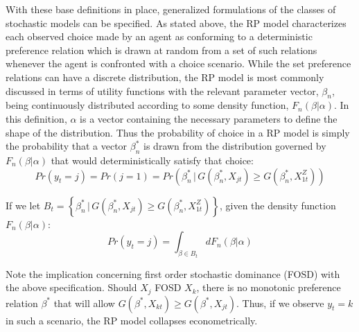 \documentclass[11pt,a4paper]{article}
\newcommand\Prob{\ensuremath{\mathit{Pr}}}  %
\begin{document}
With these base definitions in place, generalized formulations of the classes of stochastic models can be specified.
As stated above, the RP model characterizes each observed choice made by an agent as conforming to a deterministic preference relation which is drawn at random from a set of such relations whenever the agent is confronted with a choice scenario.
While the set preference relations can have a discrete distribution, the RP model is most commonly discussed in terms of utility functions with the relevant parameter vector, $\beta_n$, being continuously distributed according to some density function, $F_n(\beta | \alpha)$.
In this definition, $\alpha$ is a vector containing the necessary parameters to define the shape of the distribution.
Thus the probability of choice in a RP model is simply the probability that a vector $\beta_n^*$ is drawn from the distribution governed by $F_n(\beta | \alpha)$ that would deterministically satisfy that choice:
\begin{equation}
	\label{eq:RP0}
	{\Prob}(y_t=j) = {\Prob}(j=1) = {\Prob}\left( \beta_n^* \,|\, G(\beta_n^*,X_{jt}) \geq G(\beta_n^*,X_{1t}^Z)\right)
\end{equation}

\noindent If we let $ B_t = \left\{ \beta_n^* \,|\, G(\beta_n^*,X_{jt}) \geq G(\beta_n^*,X_{1t}^Z)\right\}$, given the density function $F_n(\beta | \alpha)$:
\begin{equation}
	\label{eq:RP.f}
	{\Prob}(y_t=j) = \int_{\beta \in B_t} dF_n(\beta|\alpha)
\end{equation}

Note the implication concerning first order stochastic dominance (FOSD){\footnotemark} with the above specification. Should $X_j$ FOSD $X_k$, there is no monotonic preference relation $\beta^*$ that will allow $G(\beta^*,X_{kt}) \geq G(\beta^*,X_{jt})$.
Thus, if we observe $y_t = k$ in such a scenario, the RP model collapses econometrically.

\addtocounter{footnote}{-1}
\end{document}
